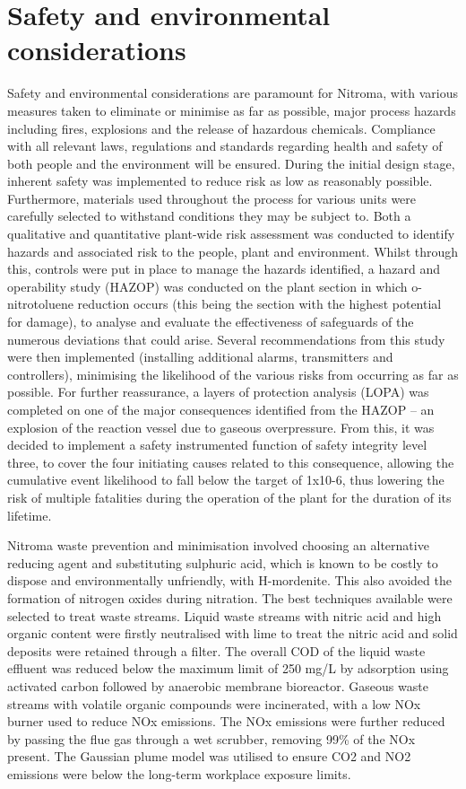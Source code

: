 \section*{Safety and environmental considerations}

Safety and environmental considerations are paramount for Nitroma, with various measures taken to eliminate or minimise as far as possible, major process hazards including fires, explosions and the release of hazardous chemicals. Compliance with all relevant laws, regulations and standards regarding health and safety of both people and the environment will be ensured.  During the initial design stage, inherent safety was implemented to reduce risk as low as reasonably possible. Furthermore, materials used throughout the process for various units were carefully selected to withstand conditions they may be subject to. Both a qualitative and quantitative plant-wide risk assessment was conducted to identify hazards and associated risk to the people, plant and environment. Whilst through this, controls were put in place to manage the hazards identified, a hazard and operability study (HAZOP) was conducted on the plant section in which o-nitrotoluene reduction occurs (this being the section with the highest potential for damage), to analyse and evaluate the effectiveness of safeguards of the numerous deviations that could arise. Several recommendations from this study were then implemented (installing additional alarms, transmitters and controllers), minimising the likelihood of the various risks from occurring as far as possible. For further reassurance, a layers of protection analysis (LOPA) was completed on one of the major consequences identified from the HAZOP – an explosion of the reaction vessel due to gaseous overpressure.  From this, it was decided to implement a safety instrumented function of safety integrity level three, to cover the four initiating causes related to this consequence, allowing the cumulative event likelihood to fall below the target of 1x10-6, thus lowering the risk of multiple fatalities during the operation of the plant for the duration of its lifetime. 

Nitroma waste prevention and minimisation involved choosing an alternative reducing agent and substituting sulphuric acid, which is known to be costly to dispose and environmentally unfriendly, with H-mordenite. This also avoided the formation of nitrogen oxides during nitration. The best techniques available were selected to treat waste streams. Liquid waste streams with nitric acid and high organic content were firstly neutralised with lime to treat the nitric acid and solid deposits were retained through a filter. The overall COD of the liquid waste effluent was reduced below the maximum limit of 250 mg/L by adsorption using activated carbon followed by anaerobic membrane bioreactor. Gaseous waste streams with volatile organic compounds were incinerated, with a low NOx burner used to reduce NOx emissions. The NOx emissions were further reduced by passing the flue gas through a wet scrubber, removing 99\% of the NOx present. The Gaussian plume model was utilised to ensure CO2 and NO2 emissions were below the long-term workplace exposure limits.  

